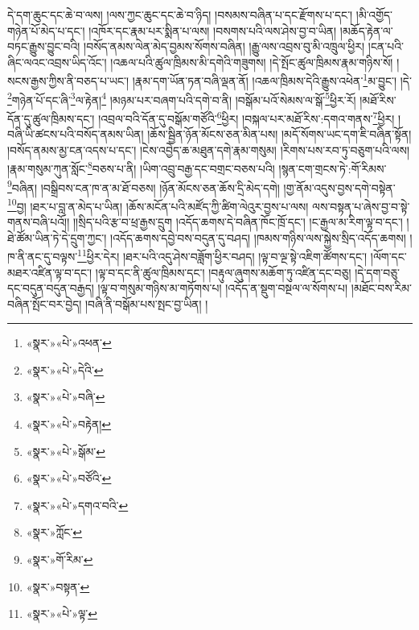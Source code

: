 དེ་དག་ཆུང་དང་ཆེ་བ་ལས། །ལས་ཀྱང་ཆུང་དང་ཆེ་བ་ཉིད། །བསམས་བཞིན་པ་དང་རྫོགས་པ་དང་། །མི་འགྱོད་གཉེན་པོ་མེད་པ་དང་། །འཁོར་དང་རྣམ་པར་སྨིན་པ་ལས། །བསགས་པའི་ལས་ཤེས་བྱ་བ་ཡིན། །མཆོད་རྟེན་ལ་བཏང་རྒྱུས་བྱུང་བའི། །བསོད་ནམས་ལེན་མེད་བྱམས་སོགས་བཞིན། །རྒྱུ་ལས་འབྲས་བུ་མི་འཁྲུལ་ཕྱིར། །ངན་པའི་ཞིང་ལའང་འབྲས་ཡིད་འོང་། །འཆལ་པའི་ཚུལ་ཁྲིམས་མི་དགེའི་གཟུགས། །དེ་སྤོང་ཚུལ་ཁྲིམས་རྣམ་གཉིས་སོ། །སངས་རྒྱས་ཀྱིས་ནི་བཅད་པ་ཡང་། །རྣམ་དག་ཡོན་ཏན་བཞི་ལྡན་ནོ། །འཆལ་ཁྲིམས་དེའི་རྒྱུས་འཕེན་\footnote{«སྣར་»«པེ་»འཕན་}མ་བྱུང་། །དེ་\footnote{«སྣར་»«པེ་»དེའི་}གཉེན་པོ་དང་ཞི་\footnote{«སྣར་»«པེ་»བཞི་}ལ་རྟེན།\footnote{«སྣར་»«པེ་»བརྟེན།} །མཉམ་པར་བཞག་པའི་དགེ་བ་ནི། །བསྒོམ་པའོ་སེམས་ལ་སྒོ་\footnote{«སྣར་»«པེ་»སྒོམ་}ཕྱིར་རོ། །མཐོ་རིས་དོན་དུ་ཚུལ་ཁྲིམས་དང་། །འབྲལ་བའི་དོན་དུ་བསྒོམ་གཙོའི་\footnote{«སྣར་»«པེ་»བཙོའི་}ཕྱིར། །བསྐལ་པར་མཐོ་རིས་:དགའ་གནས་\footnote{«སྣར་»«པེ་»དགའ་བའི་}ཕྱིར། །བཞི་ཡི་ཚངས་པའི་བསོད་ནམས་ཡིན། །ཆོས་སྦྱིན་ཉོན་མོངས་ཅན་མིན་པས། །མདོ་སོགས་ཡང་དག་ཇི་བཞིན་སྟོན། །བསོད་ནམས་མྱ་ངན་འདས་པ་དང་། །ངེས་འབྱེད་ཆ་མཐུན་དགེ་རྣམ་གསུམ། །རིགས་པས་རབ་ཏུ་བཅུག་པའི་ལས། །རྣམ་གསུམ་ཀུན་སློང་\footnote{«སྣར་»ཀློང་}བཅས་པ་ནི། །ཡིག་འབྲུ་བརྒྱ་དང་བགྲང་བཅས་པའི། །སྙན་ངག་གྲངས་ཏེ་:གོ་རིམས་\footnote{«སྣར་»གོ་རིམ་}བཞིན། །བསྒྲིབས་ངན་ཁ་ན་མ་ཐོ་བཅས། །ཉོན་མོངས་ཅན་ཆོས་དྲི་མེད་དགེ། །གྱ་ནོམ་འདུས་བྱས་དགེ་བསྟེན་\footnote{«སྣར་»བསྟན་}བྱ། །ཐར་པ་བླ་ན་མེད་པ་ཡིན། །ཆོས་མངོན་པའི་མཛོད་ཀྱི་ཚིག་ལེའུར་བྱས་པ་ལས། ལས་བསྟན་པ་ཞེས་བྱ་བ་སྟེ་གནས་བཞི་པའོ།། །།སྲིད་པའི་རྩ་བ་ཕྲ་རྒྱས་དྲུག །འདོད་ཆགས་དེ་བཞིན་ཁོང་ཁྲོ་དང་། །ང་རྒྱལ་མ་རིག་ལྟ་བ་དང་། །ཐེ་ཚོམ་ཡིན་ཏེ་དེ་དྲུག་ཀྱང་། །འདོད་ཆགས་དབྱེ་བས་བདུན་དུ་བཤད། །ཁམས་གཉིས་ལས་སྐྱེས་སྲིད་འདོད་ཆགས། །ཁ་ནི་ནང་དུ་བལྟས་\footnote{«སྣར་»«པེ་»ལྟ་}ཕྱིར་དེར། །ཐར་པའི་འདུ་ཤེས་བཟློག་ཕྱིར་བཤད། །ལྟ་བ་ལྔ་སྟེ་འཇིག་ཚོགས་དང་། །ལོག་དང་མཐར་འཛིན་ལྟ་བ་དང་། །ལྟ་བ་དང་ནི་ཚུལ་ཁྲིམས་དང་། །བརྟུལ་ཞུགས་མཆོག་ཏུ་འཛིན་དང་བཅུ། །དེ་དག་བཅུ་དང་བདུན་བདུན་བརྒྱད། །ལྟ་བ་གསུམ་གཉིས་མ་གཏོགས་པ། །འདོད་ན་སྡུག་བསྔལ་ལ་སོགས་པ། །མཐོང་བས་རིམ་བཞིན་སྤོང་བར་བྱེད། །བཞི་ནི་བསྒོམ་པས་སྤང་བྱ་ཡིན། །
